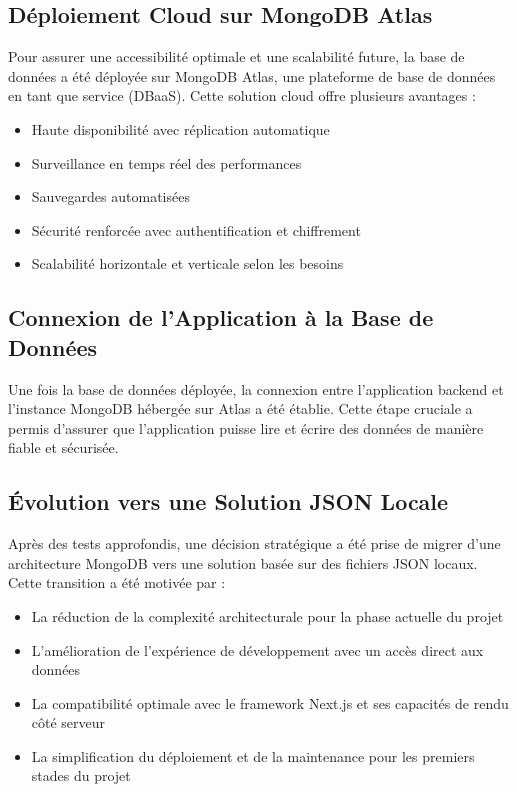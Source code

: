 \subsection{Déploiement Cloud sur MongoDB Atlas}

Pour assurer une accessibilité optimale et une scalabilité future, la base de données a été déployée sur MongoDB Atlas, une plateforme de base de données en tant que service (DBaaS). Cette solution cloud offre plusieurs avantages :

\begin{itemize}
  \item Haute disponibilité avec réplication automatique
  \item Surveillance en temps réel des performances
  \item Sauvegardes automatisées
  \item Sécurité renforcée avec authentification et chiffrement
  \item Scalabilité horizontale et verticale selon les besoins
\end{itemize}

\subsection{Connexion de l'Application à la Base de Données}

Une fois la base de données déployée, la connexion entre l'application backend et l'instance MongoDB hébergée sur Atlas a été établie. Cette étape cruciale a permis d'assurer que l'application puisse lire et écrire des données de manière fiable et sécurisée.

\subsection{Évolution vers une Solution JSON Locale}

Après des tests approfondis, une décision stratégique a été prise de migrer d'une architecture MongoDB vers une solution basée sur des fichiers JSON locaux. Cette transition a été motivée par :

\begin{itemize}
  \item La réduction de la complexité architecturale pour la phase actuelle du projet
  \item L'amélioration de l'expérience de développement avec un accès direct aux données
  \item La compatibilité optimale avec le framework Next.js et ses capacités de rendu côté serveur
  \item La simplification du déploiement et de la maintenance pour les premiers stades du projet
\end{itemize}

